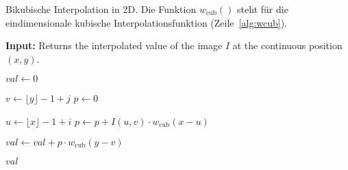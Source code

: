 \documentclass[notitlepage,english]{hgbreport}
\begin{document}
\show\State


\begin{algorithm}
\caption{Bikubische Interpolation in 2D.
	Die Funktion $w_{\mathrm{cub}}()$ steht für die 
	eindimensionale kubische Interpolationsfunktion (Zeile~\ref{alg:wcub}).}
\label{alg:Example}

\begin{algorithmic}[1]     %
 
	\Statex \textbf{Input:} 
	\Statex Returns the interpolated value of the image $I$ at the continuous position $(x, y)$.
	
	\State $\mathit{val} \gets 0$
	
	 
		\State $v \gets \lfloor y \rfloor - 1 + j$
		\State $p \gets 0$
		
		 
			\State $u \gets \lfloor x \rfloor - 1 + i$
			\State $p \gets p + I(u,v) \cdot w_{\mathrm{cub}}(x - u )$
					\label{alg:wcub}
		\EndFor
		
		\State $\mathit{val} \gets \mathit{val} + p \cdot w_{\mathrm{cub}}(y - v)$
	\EndFor
	
	\State\Return $\mathit{val}$
	
\EndProcedure
\end{algorithmic}
\end{algorithm}

\end{document}
